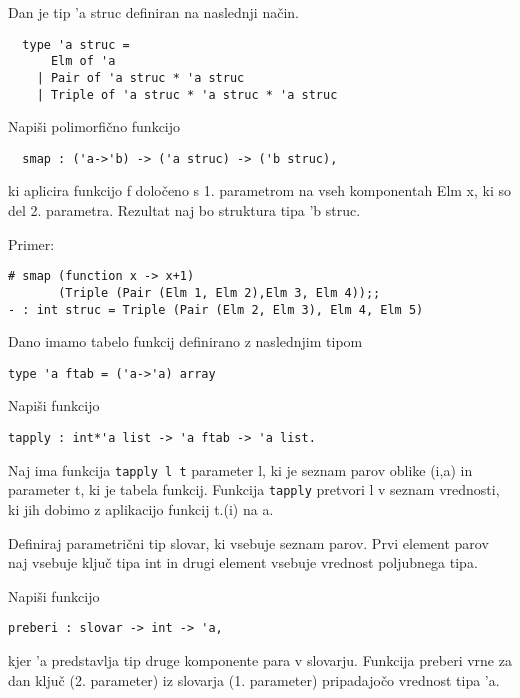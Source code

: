 \begin{ex}
  Dan je tip 'a struc definiran na naslednji na\v cin.
\begin{lstlisting}
  type 'a struc = 
      Elm of 'a 
    | Pair of 'a struc * 'a struc 
    | Triple of 'a struc * 'a struc * 'a struc
\end{lstlisting}
  Napi\v si polimorfi\v cno funkcijo
\begin{lstlisting}
  smap : ('a->'b) -> ('a struc) -> ('b struc),
\end{lstlisting}
  ki aplicira funkcijo f dolo\v ceno s 1. parametrom na vseh komponentah Elm x, ki so del 2. parametra. Rezultat naj bo struktura tipa 'b struc.

\noindent\/Primer:            
\begin{lstlisting}
# smap (function x -> x+1) 
       (Triple (Pair (Elm 1, Elm 2),Elm 3, Elm 4));; 
- : int struc = Triple (Pair (Elm 2, Elm 3), Elm 4, Elm 5) 
\end{lstlisting}
\end{ex} 




\begin{ex}
Dano imamo tabelo funkcij definirano z naslednjim tipom
\begin{lstlisting}
type 'a ftab = ('a->'a) array
\end{lstlisting}

Napi\v si funkcijo
\begin{lstlisting}
tapply : int*'a list -> 'a ftab -> 'a list.
\end{lstlisting}

Naj ima funkcija \lstinline{tapply l t} parameter l, ki je seznam parov oblike (i,a) in parameter t, ki je tabela funkcij. Funkcija \lstinline{tapply} pretvori l v seznam vrednosti, ki jih dobimo z aplikacijo funkcij t.(i) na a.
\end{ex} 




\begin{ex}
Definiraj parametri\v cni tip slovar, ki vsebuje seznam parov. Prvi element parov naj vsebuje klju\v c tipa int in drugi element vsebuje vrednost poljubnega tipa.

Napi\v si funkcijo 
\begin{lstlisting}
preberi : slovar -> int -> 'a, 
\end{lstlisting}
kjer 'a predstavlja tip druge komponente para v slovarju. Funkcija preberi vrne za dan klju\v c (2. parameter) iz slovarja (1. parameter) pripadajo\v co vrednost tipa 'a.
\end{ex} 




